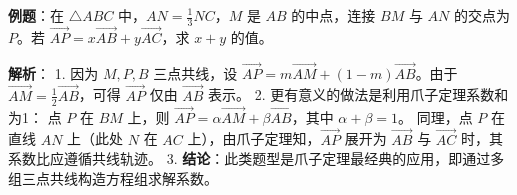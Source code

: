 \begin{examplebox}
\textbf{例题}：在 $\triangle ABC$ 中，$AN = \frac{1}{3}NC$，$M$ 是 $AB$ 的中点，连接 $BM$ 与 $AN$ 的交点为 $P$。若 $\vec{AP} = x \vec{AB} + y \vec{AC}$，求 $x+y$ 的值。

\textbf{解析}：
1. 因为 $M, P, B$ 三点共线，设 $\vec{AP} = m \vec{AM} + (1-m) \vec{AB}$。由于 $\vec{AM} = \frac{1}{2}\vec{AB}$，可得 $\vec{AP}$ 仅由 $\vec{AB}$ 表示。
2. 更有意义的做法是利用爪子定理系数和为1：
   点 $P$ 在 $BM$ 上，则 $\vec{AP} = \alpha \vec{AM} + \beta \vec{AB}$，其中 $\alpha + \beta = 1$。
   同理，点 $P$ 在直线 $AN$ 上（此处 $N$ 在 $AC$ 上），由爪子定理知，$\vec{AP}$ 展开为 $\vec{AB}$ 与 $\vec{AC}$ 时，其系数比应遵循共线轨迹。
3. \textbf{结论}：此类题型是爪子定理最经典的应用，即通过多组三点共线构造方程组求解系数。
\end{examplebox}